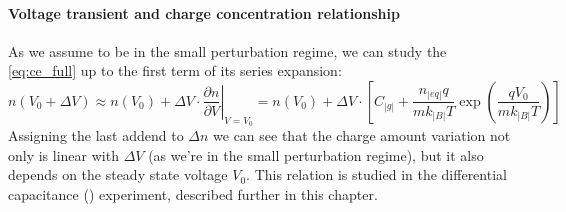 		\paragraph{Voltage transient and charge concentration relationship}
		As we assume to be in the small perturbation regime, we can study the \cref{eq:ce_full} up to the first term of its series expansion:
		\begin{dmath}
			n(V_0 + \Delta V) \approx n(V_0) + \Delta V \cdot \left.\frac{\partial n}{\partial V}\right\rvert_{V=V_0} = n(V_0) + \Delta V \cdot \left[C_|g| + \frac{n_|eq| q}{mk_|B|T}\exp(\frac{qV_0}{mk_|B|T})\right]
		\end{dmath}
		Assigning the last addend to $\Delta n$ we can see that the charge amount variation not only is linear with $\Delta V$ (as we're in the small perturbation regime), but it also depends on the steady state voltage $V_0$.
		This relation is studied in the differential capacitance () experiment, described further in this chapter.

